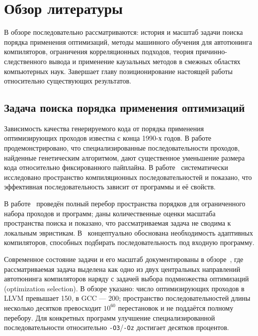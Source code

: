 \section{Обзор литературы}

В обзоре последовательно рассматриваются: история и масштаб задачи поиска порядка применения оптимизаций, методы машинного обучения для автотюнинга компиляторов, ограничения корреляционных подходов, теория причинно-следственного вывода и применение каузальных методов в смежных областях компьютерных наук. Завершает главу позиционирование настоящей работы относительно существующих результатов.

\subsection{Задача поиска порядка применения оптимизаций}

Зависимость качества генерируемого кода от порядка применения оптимизирующих проходов известна с конца 1990-х годов. В работе~\cite{cooper1999genetic} продемонстрировано, что специализированные последовательности проходов, найденные генетическим алгоритмом, дают существенное уменьшение размера кода относительно фиксированного пайплайна. В работе~\cite{almagor2004finding} систематически исследовано пространство компиляционных последовательностей и показано, что эффективная последовательность зависит от программы и её свойств.

В работе~\cite{kulkarni2006exhaustive} проведён полный перебор пространства порядков для ограниченного набора проходов и программ; даны количественные оценки масштаба пространства поиска и показано, что рассматриваемая задача не сводима к локальным эвристикам. В~\cite{cooper2002adaptive} концептуально обоснована необходимость адаптивных компиляторов, способных подбирать последовательность под входную программу.

Современное состояние задачи и его масштаб документированы в обзоре~\cite{ashouri2018survey}, где рассматриваемая задача выделена как одно из двух центральных направлений автотюнинга компиляторов наряду с задачей выбора подмножества оптимизаций (optimization selection). В обзоре указано: число оптимизирующих проходов в LLVM превышает 150, в GCC --- 200; пространство последовательностей длины несколько десятков превосходит $10^{60}$ перестановок и не поддаётся полному перебору. Для конкретных программ улучшение специализированной последовательности относительно \texttt{-O3}/\texttt{-Oz} достигает десятков процентов.

